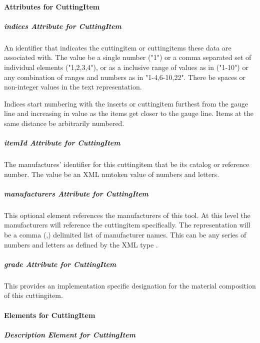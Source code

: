 \FloatBarrier

\paragraph{Attributes for CuttingItem}\mbox{}



\subparagraph{indices Attribute for CuttingItem}\mbox{}

An identifier that indicates the \gls{cuttingitem} or \glspl{cuttingitem} these data are associated with.  The value \MUST be a single number ("1") or a comma separated set of individual elements ("1,2,3,4"), or as a inclusive range of values as in ("1-10") or any combination of ranges and numbers as in "1-4,6-10,22".  There \MUSTNOT be spaces or non-integer values in the text representation. 

Indices \SHOULD start numbering with the inserts or \gls{cuttingitem} furthest from the gauge line and increasing in value as the items get closer to the gauge line. Items at the same distance \MAY be arbitrarily numbered.

\subparagraph{itemId Attribute for CuttingItem}\mbox{}

The manufactures’ identifier for this \gls{cuttingitem} that \MAY be its catalog or reference number.  The value \MUST be an XML \gls{nmtoken} value of numbers and letters.

\subparagraph{manufacturers Attribute for CuttingItem}\mbox{}

This optional element references the manufacturers of this tool.  At this level the manufacturers will reference the \gls{cuttingitem} specifically.  The representation will be a comma (,) delimited list of manufacturer names.  This can be any series of numbers and letters as defined by the XML type .

\subparagraph{grade Attribute for CuttingItem}\mbox{}

This provides an implementation specific designation for the material composition of this \gls{cuttingitem}.

\paragraph{Elements for CuttingItem}\mbox{}



\subparagraph{Description Element for CuttingItem}\mbox{}

